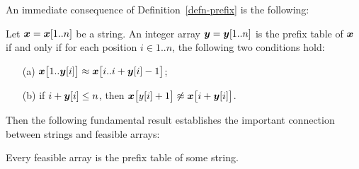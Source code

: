 \documentclass[runningheads,a4paper]{llncs}
\def\qedbox#1#2{\vbox{\hrule height.2pt
  \hbox{\vrule width.2pt height#2pt \kern#1pt \vrule width.2pt}
  \hrule height.2pt}}
\def\qed{\hfill \quad\qedbox46\newline\smallbreak}
\def\s#1{\mbox{\boldmath $#1$}}
\def\+{\!+\!}
\def\match{\approx}
\newif\ifProofs
\begin{document}
An immediate consequence of Definition~\ref{defn-prefix} is the following:
\begin{lemma}
\label{lemm-easy}
Let $\s{x} = \s{x}[1..n]$ be a string.
An integer array $\s{y} = \s{y}[1..n]$ is the prefix table
of $\s{x}$ if and only if for each position $i \in 1..n$,
the following two conditions hold:
\begin{itemize}
\item[(a)] $\s{x}\big[1..\s{y}[i]\big] \match \s{x}\big[i..i+ \s{y}[i]-1\big]$;
\item[(b)] if $i + \s{y}[i] \le n$, then $\s{x}\big[y[i]+1\big] \not\match \s{x}\big[i +\s{y}[i]\big]$.
\end{itemize}
\end{lemma}
Then the following fundamental result establishes the important connection
between strings and feasible arrays:

\begin{lemma}
\label{lemm-feas}
Every feasible array is the prefix table of some string.
\end{lemma}
\ifProofs
 \begin{proof}
 Consider an undirected graph $\mathcal{P} = (V, E)$ whose vertex set $V$ is the set of positions $1..n$ in a given feasible
 array $\s{y}$.  The edge set $E$ consists of the 2-element subsets $(h, k)$ such that
 \begin{equation}
\label{eq}
 h \in 1..\s{y}[i]; \ k = i+h-1
 \end{equation}
for every $i \in 2..n$.
We then define \s{x} as follows:
for each non-isolated vertex $i$,
let $\s{x}[i]$ be the set of edges incident with $i$;
for each isolated vertex $i$, let $\s{x}[i]$ be the loop $\{i, i\}$.
Let $\Sigma = E \cup L$ where $L$ is the set of loops.
We claim that $\s{y}$ is the prefix table of $\s{x} = \s{x}[1..n]$.

To see this, note that for an index $i$ such that $\s{y}[i]>0$,
Lemma \ref{lemm-easy}(a) is satisfied by construction.
Then suppose that for some $\s{y}[i] > 0$ and $i\+ \s{y}[i] \le n$,
$\s{x}\big[y[i]\+ 1\big] \match \s{x}\big[i\+ \s{y}[i]\big]$.
But this contradicts Lemma~\ref{lemm-easy}(b),
and so $$\s{x}\big[y[i]\+ 1\big] \not\match \s{x}\big[i\+ \s{y}[i]\big].$$

In case $\s{y}[i] = 0$, Lemma \ref{lemm-easy}(a) is satisfied vacuously.
Moreover, $i$ is isolated and thus $\s{x}[i] = \{i, i\}$,
which does not match $\s{x}[1]$; consequently,
Lemma  \ref{lemm-easy}(b) is again satisfied.
Therefore, $\s{y}$
 coincides with the prefix table of $\s{x}$, which is a string over the set $\Sigma'$ of subsets of $\Sigma$. \qed
\end{proof}
\fi
\end{document}
